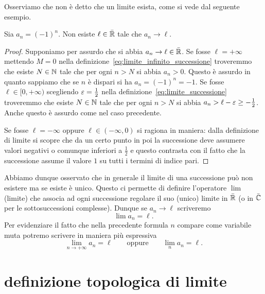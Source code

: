 Osserviamo che non è detto che un limite esista, come si vede dal seguente esempio.

\begin{example}
Sia $a_n = (-1)^n$. Non esiste $\ell \in \bar {\mathbb R}$
tale che $a_n \to \ell$.
\end{example}
\begin{proof}
Supponiamo per assurdo che si abbia $a_n\to \ell\in \bar {\mathbb R}$.
Se fosse $\ell=+\infty$ mettendo $M=0$ nella definizione~\eqref{eq:limite_infinito_successione}
troveremmo che esiste $N\in \mathbb N$ tale che per ogni $n>N$
si abbia $a_n>0$. Questo è assurdo in quanto sappiamo che se
$n$ è dispari si ha $a_n = (-1)^n = -1$.
Se fosse $\ell\in[0,+\infty)$ scegliendo $\varepsilon=\frac 1 2$  nella definizione~\eqref{eq:limite_successione} troveremmo che
esiste $N\in \mathbb N$ tale che per ogni $n>N$ si abbia $a_n > \ell-\varepsilon \ge -\frac 1 2$. Anche questo è assurdo come nel caso precedente.

Se fosse $\ell=-\infty$ oppure $\ell\in (-\infty,0)$ si ragiona
in maniera: dalla definizione di limite si scopre che da un certo punto
in poi la successione deve assumere valori negativi o comunque inferiori a $\frac 1 2$ e questo contrasta con il fatto che la
successione assume il valore $1$ su tutti i termini di indice pari.
\end{proof}

Abbiamo dunque osservato che in generale il limite di una successione può
non esistere ma se esiste è unico.
Questo ci permette di definire l'operatore $\lim$
(limite) che associa ad ogni successione regolare
il suo (unico) limite in $\bar {\mathbb R}$
(o in $\bar {\mathbb C}$ per le sottosuccessioni complesse).
Dunque se $a_n \to \ell$ scriveremo
\[
  \lim a_n = \ell.
\]
Per evidenziare il fatto che nella precedente formula
$n$ compare come variabile muta potremo scrivere
in maniera più espressiva
\[
   \lim_{n\to+\infty} a_n = \ell
   \qquad\text{oppure}\qquad
   \lim_n a_n = \ell.
\]

\section{definizione topologica di limite}

